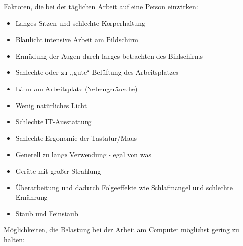 \documentclass[asp1.tex]{subfiles}
\begin{document}
Faktoren, die bei der täglichen Arbeit auf eine Person einwirken:
\begin{itemize}
    \item Langes Sitzen und schlechte Körperhaltung
    \item Blaulicht intensive Arbeit am Bildschirm
    \item Ermüdung der Augen durch langes betrachten des Bildschirms
    \item Schlechte oder zu „gute“ Belüftung des Arbeitsplatzes
    \item Lärm am Arbeitsplatz (Nebengeräusche)
    \item Wenig natürliches Licht
    \item Schlechte IT-Ausstattung
    \item Schlechte Ergonomie der Tastatur/Maus
    \item Generell zu lange Verwendung - egal von was
    \item Geräte mit großer Strahlung
    \item Überarbeitung und dadurch Folgeeffekte wie Schlafmangel und schlechte Ernährung
    \item Staub und Feinstaub
\end{itemize}


Möglichkeiten, die Belastung bei der Arbeit am Computer möglichst gering zu halten:
\end{document}
